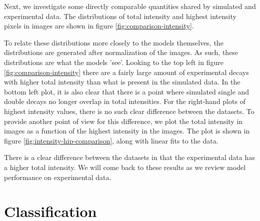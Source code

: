 \noindent Next, we investigate some directly comparable quantities shared by simulated and
experimental data. The distributions of total intensity and highest intensity pixels
in images are shown in figure \ref{fig:comparison-intensity}. 

\noindent To relate these distributions more closely to the models themselves, 
the distributions are generated after normalization of the
images. As such, these distributions are what the models 'see'. Looking to the top left
in figure \ref{fig:comparison-intensity} there are a fairly large amount of experimental
decays with higher total intensity than what is present in the simulated data. In the bottom
left plot, it is also clear that there is a point where simulated single and double decays no longer
overlap in total intensities. For the right-hand plots of highest intensity values, there is no such
clear difference between the datasets.
To provide another point of view for this difference, we plot the total intensity in images as
a function of the highest intensity in the images. 
The plot is shown in figure \ref{fig:intensity-hip-comparison}, along with linear fits to the
data.

\noindent There is a clear difference between the datasets in that the experimental data
has a higher total intensity. We will come back to these results as we review model
performance on experimental data.

\section{Classification}
